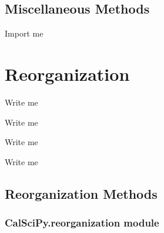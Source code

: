 \documentclass[letterpaper,10pt,english]{sphinxmanual}
\begin{document}
\subsection{Miscellaneous Methods}
\label{\detokenize{Sub-Packages:miscellaneous-methods}}
\begin{DUlineblock}{0em}
\item[] Import me
\end{DUlineblock}


\section{Reorganization}
\label{\detokenize{Sub-Packages:reorganization}}\label{\detokenize{Sub-Packages:reorganization-module}}
\begin{DUlineblock}{0em}
\item[] Write me
\item[] Write me
\item[] Write me
\item[] Write me
\end{DUlineblock}


\subsection{Reorganization Methods}
\label{\detokenize{Sub-Packages:reorganization-methods}}
\sphinxstepscope


\subsubsection{CalSciPy.reorganization module}
\label{\detokenize{CalSciPy.reorganization:module-CalSciPy.reorganization}}\label{\detokenize{CalSciPy.reorganization:calscipy-reorganization-module}}\label{\detokenize{CalSciPy.reorganization::doc}}
\end{document}
